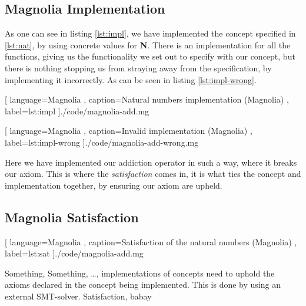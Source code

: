\subsection{Magnolia Implementation}

As one can see in listing \ref{lst:impl}, we have implemented the concept
specified in \ref{lst:nat}, by using concrete values for \textbf{N}. There is an
implementation for all the functions, giving us the functionality we set out to
specify with our concept, but there is nothing stopping us from straying away
from the specification, by implementing it incorrectly. As can be seen in
listing \ref{lst:impl-wrong}.

\begin{center}
  
    [ language=Magnolia
    , caption={Natural numbers implementation (Magnolia)}
    , label=lst:impl
    ]{./code/magnolia-add.mg}
\end{center}

\begin{center}
  
    [ language=Magnolia
    , caption={Invalid implementation (Magnolia)}
    , label=lst:impl-wrong
    ]{./code/magnolia-add-wrong.mg}
\end{center}

Here we have implemented our addiction operator in such a way, where it breaks
our axiom. This is where the \textit{satisfaction} comes in, it is what ties the
concept and implementation together, by ensuring our axiom are upheld.


\subsection{Magnolia Satisfaction}

\begin{center}
  
    [ language=Magnolia
    , caption={Satisfaction of the natural numbers (Magnolia)}
    , label=lst:sat
    ]{./code/magnolia-add.mg}
\end{center}

Something, Something, \dots, implementations of concepts need to uphold the
axioms declared in the concept being implemented. This is done by using an
external SMT-solver. Satisfaction, babay


